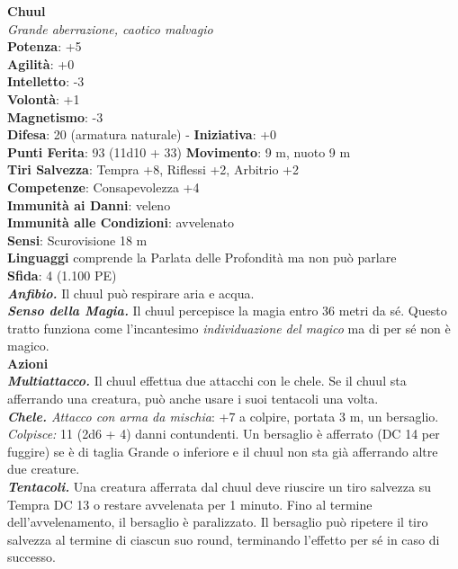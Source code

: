 \begin{multicols}{2}
\medskip\textbf{Chuul}\\
\emph{Grande aberrazione, caotico malvagio}\\
\textbf{Potenza}: +5\\
\textbf{Agilità}: +0\\
\textbf{Intelletto}: -3\\
\textbf{Volontà}: +1\\
\textbf{Magnetismo}: -3\\
\textbf{Difesa}: 20 (armatura naturale) - \textbf{Iniziativa}: +0\\
\textbf{Punti Ferita}: 93 (11d10 + 33)
\textbf{Movimento}: 9 m, nuoto 9 m\\
\textbf{Tiri Salvezza}: Tempra +8, Riflessi +2, Arbitrio +2\\
\textbf{Competenze}: Consapevolezza +4\\
\textbf{Immunità ai Danni}: veleno\\
\textbf{Immunità alle Condizioni}: avvelenato\\
\textbf{Sensi}: Scurovisione 18 m\\
\textbf{Linguaggi} comprende la Parlata delle Profondità ma non può parlare\\
\textbf{Sfida}: 4 (1.100 PE)\smallskip\\
\emph{\textbf{Anfibio.}} Il chuul può respirare aria e acqua.\\
\emph{\textbf{Senso della Magia.}} Il chuul percepisce la magia entro 36 metri da sé. Questo tratto funziona come l'incantesimo \emph{individuazione} \emph{del magico} ma di per sé non è magico.\\
\smallskip\textbf{Azioni}\\
\emph{\textbf{Multiattacco.}} Il chuul effettua due attacchi con le chele. Se il chuul sta afferrando una creatura, può anche usare i suoi tentacoli una volta.\\
\emph{\textbf{Chele.} Attacco con arma da mischia}: +7 a colpire, portata 3 m, un bersaglio.\\
\emph{Colpisce:} 11 (2d6 + 4) danni contundenti. Un bersaglio è afferrato (DC 14 per fuggire) se è di taglia Grande o inferiore e il chuul non sta già afferrando altre due creature.\\
\emph{\textbf{Tentacoli.}} Una creatura afferrata dal chuul deve riuscire un tiro salvezza su Tempra DC 13 o restare avvelenata per 1 minuto. Fino al termine dell'avvelenamento, il bersaglio è paralizzato. Il bersaglio può ripetere il tiro salvezza al termine di ciascun suo round, terminando l'effetto per sé in caso di successo.\\

\end{multicols}

